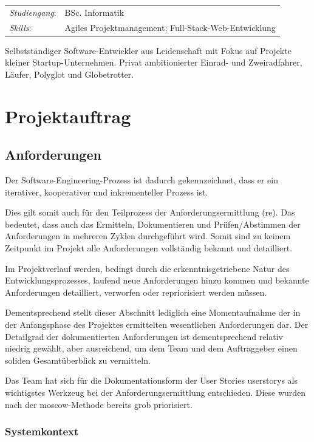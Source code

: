 \documentclass[a4paper,11pt,listof=numbered,glossary=totoc,parskip=half,toc=bib]{scrreprt}
\begin{document}
{\begin{tabularx}{\linewidth}{lX}
\toprule
\textit{Studiengang}: & BSc. Informatik\\

\textit{Skills}: & Agiles Projektmanagement; Full-Stack-Web-Entwicklung \\
\bottomrule
\end{tabularx}

Selbstständiger Software-Entwickler aus Leidenschaft mit Fokus auf Projekte kleiner Startup-Unternehmen.  Privat ambitionierter Einrad- und Zweiradfahrer, Läufer, Polyglot und Globetrotter. 
 


	\chapter{Projektauftrag}

	\section{Anforderungen}

Der Software-Engineering-Prozess ist dadurch gekennzeichnet, dass er ein iterativer, kooperativer und inkrementeller Prozess ist.

Dies gilt somit auch für den Teilprozess der Anforderungsermittlung (\Gls{re}).
Das bedeutet, dass auch das Ermitteln, Dokumentieren und Prüfen/Abstimmen der Anforderungen in mehreren Zyklen durchgeführt wird. Somit sind zu keinem Zeitpunkt im Projekt alle Anforderungen vollständig bekannt und detailliert.

Im Projektverlauf werden, bedingt durch die erkenntnisgetriebene Natur des Entwicklungsprozesses, laufend neue Anforderungen hinzu kommen und bekannte Anforderungen detailliert, verworfen oder repriorisiert werden müssen. 

Dementsprechend stellt dieser Abschnitt lediglich eine Momentaufnahme der in der Anfangsphase des Projektes ermittelten wesentlichen Anforderungen dar. Der Detailgrad der dokumentierten Anforderungen ist dementsprechend relativ niedrig gewählt, aber ausreichend, um dem Team und dem Auftraggeber einen soliden Gesamtüberblick zu vermitteln.

Das Team hat sich für die Dokumentationsform der User Stories \Glspl{userstory} als wichtigstes Werkzeug bei der Anforderungsermittlung entschieden. Diese wurden nach der \Gls{moscow}-Methode bereits grob priorisiert.

\subsection{Systemkontext}

}
\end{document}
